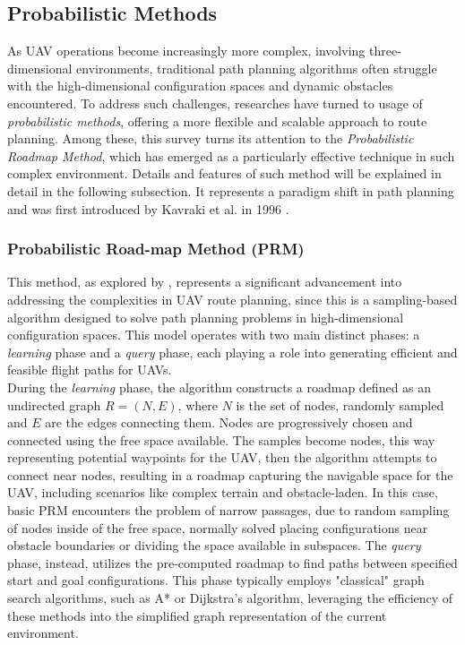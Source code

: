 \documentclass[conference]{IEEEtran}
\begin{document}
\subsection{Probabilistic Methods}

As UAV operations become increasingly more complex, involving three-dimensional environments, traditional path planning algorithms often struggle with the high-dimensional configuration spaces and dynamic obstacles encountered. To address such challenges, researches have turned to usage of \textit{probabilistic methods}, offering a more flexible and scalable approach to route planning. Among these, this survey turns its attention to the \textit{Probabilistic Roadmap Method}, which has emerged as a particularly effective technique in such complex environment. Details and features of such method will be explained in detail in the following subsection. It represents a paradigm shift in path planning and was first introduced by Kavraki et al. in 1996 \cite{originalprm}.

\subsubsection{Probabilistic Road-map Method (PRM)}

This method, as explored by \cite{paper3}, represents a significant advancement into addressing the complexities in UAV route planning, since this is a sampling-based algorithm designed to solve path planning problems in high-dimensional configuration spaces. This model operates with two main distinct phases: a \textit{learning} phase and a \textit{query} phase, each playing a role into generating efficient and feasible flight paths for UAVs. \\

During the \textit{learning} phase, the algorithm constructs a roadmap defined as an undirected graph $R = (N,E)$, where $N$ is the set of nodes, randomly sampled and $E$ are the edges connecting them. Nodes are progressively chosen and connected using the free space available. The samples become nodes, this way representing potential waypoints for the UAV, then the algorithm attempts to connect near nodes, resulting in a roadmap capturing the navigable space for the UAV, including scenarios like complex terrain and obstacle-laden. In this case, basic PRM encounters the problem of narrow passages, due to random sampling of nodes inside of the free space, normally solved placing configurations near obstacle boundaries or dividing the space available in subspaces. 
The \textit{query} phase, instead, utilizes the pre-computed roadmap to find paths between specified start and goal configurations. This phase typically employs "classical" graph search algorithms, such as A* or Dijkstra's algorithm, leveraging the efficiency of these methods into the simplified graph representation of the current environment. \\
\end{document}
